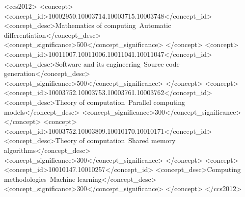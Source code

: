 \documentclass[sigconf]{acmart}
\begin{document}
\begin{CCSXML}
<ccs2012>
<concept>
<concept_id>10002950.10003714.10003715.10003748</concept_id>
<concept_desc>Mathematics of computing~Automatic differentiation</concept_desc>
<concept_significance>500</concept_significance>
</concept>
<concept>
<concept_id>10011007.10011006.10011041.10011047</concept_id>
<concept_desc>Software and its engineering~Source code generation</concept_desc>
<concept_significance>500</concept_significance>
</concept>
<concept>
<concept_id>10003752.10003753.10003761.10003762</concept_id>
<concept_desc>Theory of computation~Parallel computing models</concept_desc>
<concept_significance>300</concept_significance>
</concept>
<concept>
<concept_id>10003752.10003809.10010170.10010171</concept_id>
<concept_desc>Theory of computation~Shared memory algorithms</concept_desc>
<concept_significance>300</concept_significance>
</concept>
<concept>
<concept_id>10010147.10010257</concept_id>
<concept_desc>Computing methodologies~Machine learning</concept_desc>
<concept_significance>300</concept_significance>
</concept>
</ccs2012>
\end{CCSXML}





\maketitle












\clearpage

\end{document}
